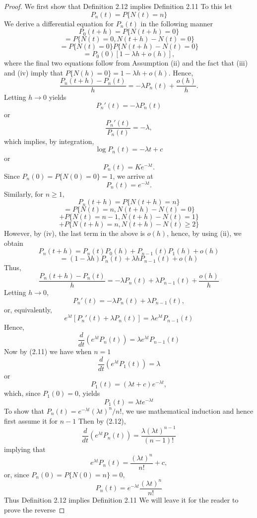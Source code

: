 \documentclass[lang=cn,10pt]{elegantbook}
\begin{document}
\begin{proof}
	We first show that Definition 2.12 implies Definition 2.11 To this let 
\[ P_n(t) = P\{N(t) = n\} \]
We derive a differential equation for $P_n(t)$ in the following manner
\[ P_0(t+h) = P\{N(t+h) = 0\} \]
\[ = P\{N(t) = 0, N(t+h) - N(t) = 0\} \]
\[ = P\{N(t) = 0\}P\{N(t+h) - N(t) = 0\} \]
\[ = P_0(0)[1 - \lambda h + o(h)], \]
where the final two equations follow from Assumption (ii) and the fact that (iii) and (iv) imply that $P\{N(h) = 0\} = 1 - \lambda h + o(h)$. Hence,
\[ \frac{P_n(t+h) - P_n(t)}{h} = -\lambda P_n(t) + \frac{o(h)}{h}. \]
Letting $h \to 0$ yields
\[ P_n'(t) = -\lambda P_n(t) \]
or
\[ \frac{P_n'(t)}{P_n(t)} = -\lambda, \]
which implies, by integration,
\[ \log P_n(t) = -\lambda t + c \]
or
\[ P_n(t) = Ke^{-\lambda t}. \]
Since $P_n(0) = P\{N(0) = 0\} = 1$, we arrive at
\begin{equation}
P_n(t) = e^{-\lambda t}.
\end{equation}
Similarly, for $n \geq 1$,
\[ P_n(t+h) = P\{N(t+h) = n\} \]
\[ = P\{N(t) = n, N(t+h) - N(t) = 0\} \]
\[ + P\{N(t) = n-1, N(t+h) - N(t) = 1\} \]
\[ + P\{N(t+h) = n, N(t+h) - N(t) \geq 2\} \]
However, by (iv), the last term in the above is $o(h)$, hence, by using (ii), we obtain
\[ P_n(t+h) = P_n(t)P_0(h) + P_{n-1}(t)P_1(h) + o(h) \]
\[ = (1 - \lambda h)P_n(t) + \lambda h P_{n-1}(t) + o(h) \]
Thus,
\[ \frac{P_n(t+h) - P_n(t)}{h} = -\lambda P_n(t) + \lambda P_{n-1}(t) + \frac{o(h)}{h} \]
Letting $h \to 0$,
\[ P_n'(t) = -\lambda P_n(t) + \lambda P_{n-1}(t), \]
or, equivalently,
\[ e^{\lambda t}[P_n'(t) + \lambda P_n(t)] = \lambda e^{\lambda t} P_{n-1}(t) \]
Hence,
\begin{equation}
\frac{d}{dt}(e^{\lambda t} P_n(t)) = \lambda e^{\lambda t} P_{n-1}(t)
\end{equation}
Now by (2.11) we have when $n = 1$
\[ \frac{d}{dt}(e^{\lambda t} P_1(t)) = \lambda \]
or
\[ P_1(t) = (\lambda t + c)e^{-\lambda t}, \]
which, since $P_1(0) = 0$, yields
\[ P_1(t) = \lambda te^{-\lambda t} \]
To show that $P_n(t) = e^{-\lambda t}(\lambda t)^n/n!$, we use mathematical induction and hence first assume it for $n - 1$ Then by (2.12),
\[ \frac{d}{dt}(e^{\lambda t} P_n(t)) = \frac{\lambda (\lambda t)^{n-1}}{(n-1)!} \]
implying that
\[ e^{\lambda t} P_n(t) = \frac{(\lambda t)^n}{n!} + c, \]
or, since $P_n(0) = P\{N(0) = n\} = 0$,
\[ P_n(t) = e^{-\lambda t} \frac{(\lambda t)^n}{n!} \]
Thus Definition 2.12 implies Definition 2.11 We will leave it for the reader to prove the reverse

\end{proof}
\end{document}
